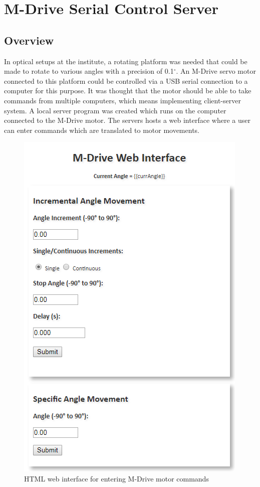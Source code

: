 \documentclass{article}
\begin{document}
\section{M-Drive Serial Control Server} \label{m-drive}

    \subsection{Overview} \label{m-drive_overview}
    
    In optical setups at the institute, a rotating platform was needed that could be made to rotate to various angles with a precision of 0.1$^\circ$. An M-Drive \cite{m-drive} servo motor connected to this platform could be controlled via a USB serial connection to a computer for this purpose. It was thought that the motor should be able to take commands from multiple computers, which means implementing client-server system. A local server program was created which runs on the computer connected to the M-Drive motor. The servers hosts a web interface where a user can enter commands which are translated to motor movements.
    
    \begin{figure}[h]
        \centering
        \includegraphics[scale=0.65]{img/m-drive_interface}
        \caption{HTML web interface for entering M-Drive motor commands}
        \label{fig:m-drive_interface}
    \end{figure}
    
\end{document}
